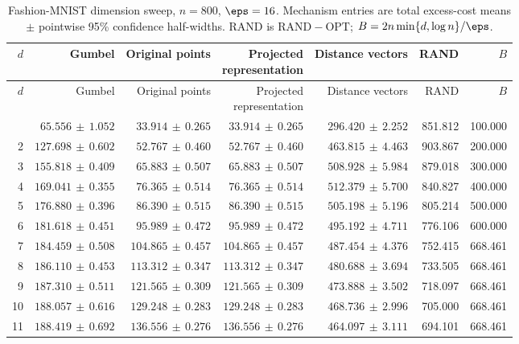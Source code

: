 \clearpage
{\scriptsize
\setlength{\tabcolsep}{3pt}
\begin{longtable}{rrrrrrr}
\caption{Fashion-MNIST dimension sweep, $n=800$, $\eps=16$. Mechanism entries are total excess-cost means $\pm$ pointwise 95\% confidence half-widths. RAND is $\mathrm{RAND}-\mathrm{OPT}$; $B=2n\min\{d,\log n\}/\eps$.}\label{tab:exp-fashion-values}\\
\toprule
$d$ & Gumbel & Original points & \shortstack{Projected\\representation} & Distance vectors & RAND & $B$\\
\midrule\endfirsthead
\toprule
$d$ & Gumbel & Original points & \shortstack{Projected\\representation} & Distance vectors & RAND & $B$\\
\midrule\endhead
\bottomrule\endfoot
1 & $65.556\,\pm\,1.052$ & $33.914\,\pm\,0.265$ & $33.914\,\pm\,0.265$ & $296.420\,\pm\,2.252$ & 851.812 & 100.000\\
2 & $127.698\,\pm\,0.602$ & $52.767\,\pm\,0.460$ & $52.767\,\pm\,0.460$ & $463.815\,\pm\,4.463$ & 903.867 & 200.000\\
3 & $155.818\,\pm\,0.409$ & $65.883\,\pm\,0.507$ & $65.883\,\pm\,0.507$ & $508.928\,\pm\,5.984$ & 879.018 & 300.000\\
4 & $169.041\,\pm\,0.355$ & $76.365\,\pm\,0.514$ & $76.365\,\pm\,0.514$ & $512.379\,\pm\,5.700$ & 840.827 & 400.000\\
5 & $176.880\,\pm\,0.396$ & $86.390\,\pm\,0.515$ & $86.390\,\pm\,0.515$ & $505.198\,\pm\,5.196$ & 805.214 & 500.000\\
6 & $181.618\,\pm\,0.451$ & $95.989\,\pm\,0.472$ & $95.989\,\pm\,0.472$ & $495.192\,\pm\,4.711$ & 776.106 & 600.000\\
7 & $184.459\,\pm\,0.508$ & $104.865\,\pm\,0.457$ & $104.865\,\pm\,0.457$ & $487.454\,\pm\,4.376$ & 752.415 & 668.461\\
8 & $186.110\,\pm\,0.453$ & $113.312\,\pm\,0.347$ & $113.312\,\pm\,0.347$ & $480.688\,\pm\,3.694$ & 733.505 & 668.461\\
9 & $187.310\,\pm\,0.511$ & $121.565\,\pm\,0.309$ & $121.565\,\pm\,0.309$ & $473.888\,\pm\,3.502$ & 718.097 & 668.461\\
10 & $188.057\,\pm\,0.616$ & $129.248\,\pm\,0.283$ & $129.248\,\pm\,0.283$ & $468.736\,\pm\,2.996$ & 705.000 & 668.461\\
11 & $188.419\,\pm\,0.692$ & $136.556\,\pm\,0.276$ & $136.556\,\pm\,0.276$ & $464.097\,\pm\,3.111$ & 694.101 & 668.461\\

\end{longtable}}
